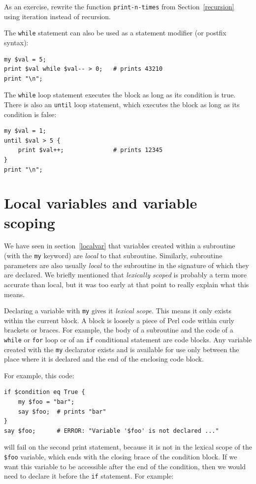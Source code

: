 As an exercise, rewrite the function \verb"print-n-times" from
Section~\ref{recursion} using iteration instead of recursion.

The {\tt while} statement can also be used as a statement modifier (or postfix syntax):

\begin{verbatim}
my $val = 5;
print $val while $val-- > 0;   # prints 43210
print "\n";
\end{verbatim}

The {\tt while} loop statement executes the block as long as 
its condition is true. There is also an {\tt until} loop 
statement, which executes the block as long as its condition 
is false:

\begin{verbatim}
my $val = 1;
until $val > 5 {
    print $val++;              # prints 12345
}
print "\n";
\end{verbatim}

\section{Local variables and variable scoping}

We have seen in section~\ref{localvar} that variables created 
within a subroutine (with the {\tt my} keyword) are 
\emph{local} to that subroutine. Similarly, subroutine 
parameters are also usually \emph{local} to the subroutine 
in the signature of which they are declared. 
We briefly mentioned that \emph{lexically scoped} 
is probably a term more accurate than local, but it was 
too early at that point to really explain what this means.


Declaring a variable with {\tt my} gives it \emph{lexical 
scope}. This means it only exists within the current block. A 
block is loosely a piece of Perl code within curly brackets or 
braces. For example, the body of a subroutine and the code of a 
{\tt while} or {\tt for} loop or of an {\tt if} conditional
statement are code blocks. Any variable created with the 
{\tt my} declarator exists and is available for use only 
between the place where it is declared and the end of the 
enclosing code block.

For example, this code:

\begin{verbatim}
if $condition eq True {
    my $foo = "bar";
    say $foo;  # prints "bar"
}
say $foo;      # ERROR: "Variable '$foo' is not declared ..."
\end{verbatim}
%
will fail on the second print statement, because it is not in 
the lexical scope of the {\tt \$foo} variable, which ends 
with the closing brace of the condition block. If we want 
this variable to be accessible after the end of the condition, 
then we would need to declare it before the {\tt if} statement. 
For example:

